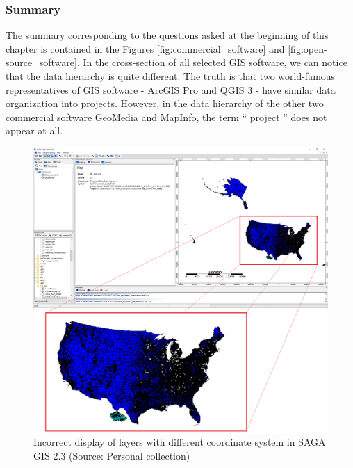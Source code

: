 \documentclass[a4paper,10pt,twoside]{article}
\begin{document}
\subsubsection{Summary}
\label{subsec:startup_concepts_summary}

The summary corresponding to the questions asked at the beginning of this chapter is contained in the Figures \ref{fig:commercial_software} and \ref{fig:open-source_software}. In the cross-section of all selected GIS software, we can notice that the data hierarchy is quite different. The truth is that two world-famous representatives of GIS software - ArcGIS Pro and QGIS 3 -  have similar data organization into projects. However, in the data hierarchy of the other two commercial software GeoMedia and MapInfo, the term `` project '' does not appear at all. 

\newpage
\begin{figure}[hbt!] 
\begin{center}
\includegraphics[width=17cm]{../pictures/saga_gis_cele.png} 
\caption[Incorrect display of layers with different coordinate system in SAGA GIS 2.3]{Incorrect display of layers with different coordinate system in SAGA GIS 2.3 (Source: Personal collection)}
\label{fig:saga_gis_cele}
\end{center}
\end{figure}
\end{document}
